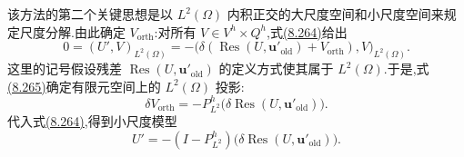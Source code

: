 \begin{note}[主要思路与方法推导]
该方法的第二个关键思想是以 $L^2(\Omega)$ 内积正交的大尺度空间和小尺度空间来规定尺度分解.由此确定 $V_{\mathrm{orth}}$:对所有 $V\in V^h\times Q^h$,式\hyperref[eq:vms-oss-subscale-ansatz]{(8.264)}给出
\begin{equation}\label{eq:vms-oss-orthogonality-condition}
 0=(U',V)_{L^2(\Omega)}
   =-\bigl(\delta(\operatorname{Res}(U,\bm u'_{\mathrm{old}})
       +V_{\mathrm{orth}}),V\bigr)_{L^2(\Omega)}.
\end{equation}
这里的记号假设残差 $\operatorname{Res}(U,\bm u'_{\mathrm{old}})$ 的定义方式使其属于 $L^2(\Omega)$.于是,式\hyperref[eq:vms-oss-orthogonality-condition]{(8.265)}确定有限元空间上的 $L^2(\Omega)$ 投影:
\[
 \delta V_{\mathrm{orth}}
 =-P^h_{L^2}\bigl(\delta\operatorname{Res}(U,\bm u'_{\mathrm{old}})\bigr).
\]
代入式\hyperref[eq:vms-oss-subscale-ansatz]{(8.264)},得到小尺度模型
\begin{equation}\label{eq:vms-oss-projected-subscale-model}
 U'=-(I-P^h_{L^2})\bigl(\delta\operatorname{Res}(U,\bm u'_{\mathrm{old}})\bigr).
\end{equation}
\end{note}


